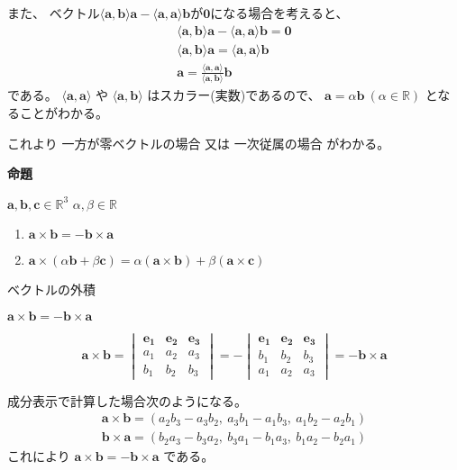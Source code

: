 \documentclass[12pt,b5paper]{ltjsarticle}
\begin{document}
また、
ベクトル$\langle \bm{a}, \bm{b} \rangle \bm{a}
 - \langle \bm{a}, \bm{a} \rangle \bm{b}$が$\bm{0}$になる場合を考えると、
\begin{gather}
 \langle \bm{a}, \bm{b} \rangle \bm{a}- \langle \bm{a}, \bm{a} \rangle \bm{b} = \bm{0}\\
 \langle \bm{a}, \bm{b} \rangle \bm{a} = \langle \bm{a}, \bm{a} \rangle \bm{b}\\
 \bm{a} = \frac{\langle \bm{a}, \bm{a} \rangle}{\langle \bm{a}, \bm{b} \rangle } \bm{b}
\end{gather}
である。
$\langle \bm{a}, \bm{a} \rangle$ や $\langle \bm{a}, \bm{b} \rangle$
はスカラー(実数)であるので、
$\bm{a}=\alpha\bm{b} \ (\alpha\in\mathbb{R})$
となることがわかる。

これより
一方が零ベクトルの場合 又は 一次従属の場合
がわかる。

\hrulefill

\textbf{命題}

$\bm{a},\bm{b},\bm{c}\in\mathbb{R}^3$
$\alpha,\beta\in\mathbb{R}$
\begin{enumerate}
 \item $\bm{a}\times \bm{b} = -\bm{b}\times \bm{a}$
 \item
       $\bm{a}\times (\alpha\bm{b}+\beta\bm{c})
      = \alpha(\bm{a}\times \bm{b})
      +\beta(\bm{a}\times \bm{c})$
\end{enumerate}

\dotfill

ベクトルの外積

$\bm{a}\times \bm{b} = -\bm{b}\times \bm{a}$

\begin{equation}
 \bm{a}\times\bm{b}
 = \begin{vmatrix}
    \bm{e_1} & \bm{e_2} & \bm{e_3}\\
    a_1 & a_2 & a_3\\
    b_1 & b_2 & b_3
   \end{vmatrix}
 = - \begin{vmatrix}
    \bm{e_1} & \bm{e_2} & \bm{e_3}\\
    b_1 & b_2 & b_3\\
    a_1 & a_2 & a_3
   \end{vmatrix}
 = - \bm{b}\times\bm{a}
\end{equation}

成分表示で計算した場合次のようになる。
\begin{gather}
 \bm{a}\times\bm{b} = (a_2b_3-a_3b_2, \ a_3b_1-a_1b_3, \ a_1b_2-a_2b_1)\\
 \bm{b}\times\bm{a} = (b_2a_3-b_3a_2, \ b_3a_1-b_1a_3, \ b_1a_2-b_2a_1)
\end{gather}
これにより
$\bm{a}\times \bm{b} = -\bm{b}\times \bm{a}$
である。
\end{document}
